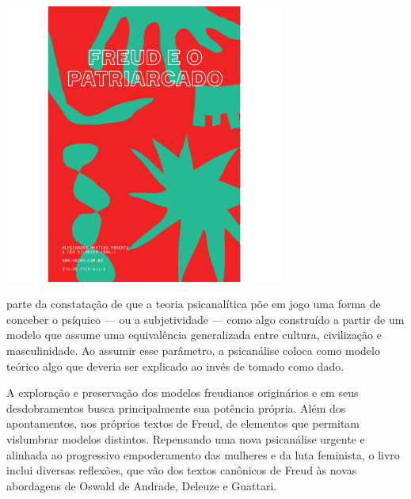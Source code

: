 \pagebreak


\begin{center}
\hspace*{.5cm}\includegraphics[width=92mm]{./grid/freud.png}
\end{center}

\hspace*{-7cm}\hrulefill\hspace*{-7cm}

\medskip

 parte da constatação de que a teoria psicanalítica põe em jogo uma forma de conceber o psíquico --- ou a subjetividade --- como algo construído a partir de um modelo que assume uma equivalência generalizada entre cultura, civilização e masculinidade. Ao assumir esse parâmetro, a psicanálise coloca como modelo teórico algo que deveria ser explicado ao invés de tomado como dado.

A exploração e preservação dos modelos freudianos originários e em seus desdobramentos busca principalmente sua potência própria. Além dos apontamentos, nos próprios textos de Freud, de elementos que permitam vislumbrar modelos distintos. Repensando uma nova psicanálise urgente e alinhada ao progressivo empoderamento das mulheres e da luta feminista, o livro inclui diversas reflexões, que vão dos textos canônicos de Freud às novas abordagens de Oswald de Andrade, Deleuze e Guattari.

\vfill

\hspace*{-.4cm}\begin{minipage}[c]{.5\linewidth}
\small{
{}}
\end{minipage}

